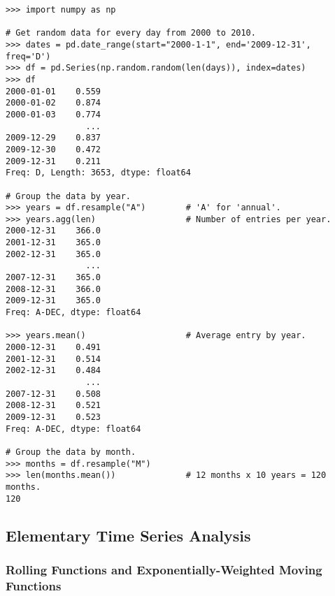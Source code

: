 \begin{lstlisting}
>>> import numpy as np

# Get random data for every day from 2000 to 2010.
>>> dates = pd.date_range(start="2000-1-1", end='2009-12-31', freq='D')
>>> df = pd.Series(np.random.random(len(days)), index=dates)
>>> df
2000-01-01    0.559
2000-01-02    0.874
2000-01-03    0.774
                ...
2009-12-29    0.837
2009-12-30    0.472
2009-12-31    0.211
Freq: D, Length: 3653, dtype: float64

# Group the data by year.
>>> years = df.resample("A")        # 'A' for 'annual'.
>>> years.agg(len)                  # Number of entries per year.
2000-12-31    366.0
2001-12-31    365.0
2002-12-31    365.0
                ...
2007-12-31    365.0
2008-12-31    366.0
2009-12-31    365.0
Freq: A-DEC, dtype: float64

>>> years.mean()                    # Average entry by year.
2000-12-31    0.491
2001-12-31    0.514
2002-12-31    0.484
                ...
2007-12-31    0.508
2008-12-31    0.521
2009-12-31    0.523
Freq: A-DEC, dtype: float64

# Group the data by month.
>>> months = df.resample("M")
>>> len(months.mean())              # 12 months x 10 years = 120 months.
120
\end{lstlisting}

\begin{comment}
\begin{problem} %
The file \texttt{website\_traffic.csv} contains records for different visits to a fictitious website.
Read in the data, calculate the duration of each visit in seconds and convert the index to a \li{DatetimeIndex}.
Use downsampling to calculate the number of visits each minute and the number of visits each hour.
Return these DataFrames.

(Hint: \li{minute.agg(func)} returns a DataFrame).
\end{problem}
\end{comment}
\subsection*{Elementary Time Series Analysis} %

\subsubsection*{Rolling Functions and Exponentially-Weighted Moving Functions}

